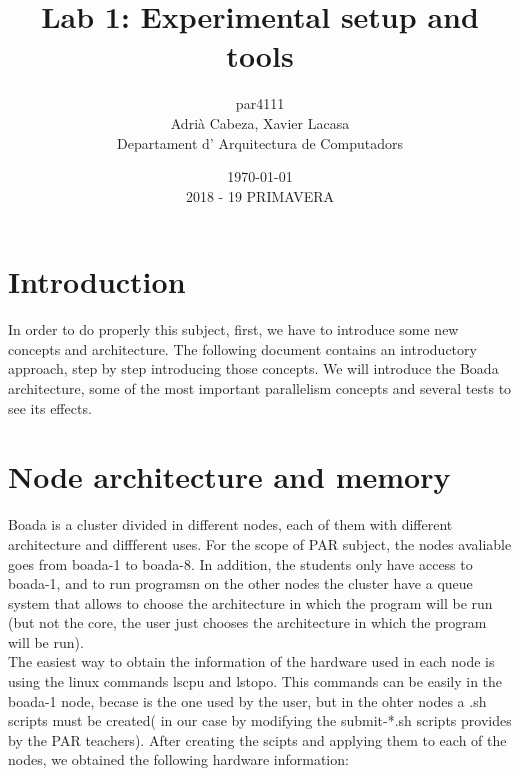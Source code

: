 \documentclass[12]{article}
\author{par4111 \\ Adrià Cabeza, Xavier Lacasa \\ Departament d' Arquitectura de Computadors}
\title{Lab 1: Experimental setup and tools}
\date{\today \\ 2018 - 19 PRIMAVERA}
\begin{document}
\maketitle
\newpage
\tableofcontents
\newpage
\section{Introduction}
In order to do properly this subject, first, we have to introduce some new concepts and architecture.  The following document contains an introductory approach, step by step introducing those concepts. We will introduce the Boada architecture, some of the most important parallelism concepts and several tests to see its effects. 

\section{Node architecture and memory}
Boada is a cluster divided in different nodes, each of them with different architecture and diffferent uses. For the scope of PAR subject, the nodes avaliable goes from boada-1 to boada-8. In addition, the students only have access to boada-1, and to run programsn on the other nodes the cluster have a queue system that allows to choose the architecture in which the program will be run (but not the core, the user just chooses the architecture in which the program will be run).
\\
The easiest way to obtain the information of the hardware used in each node is using the linux commands lscpu and lstopo. This commands can be easily in the boada-1 node, becase is the one used by the user, but in the ohter nodes a .sh scripts must be created( in our case by modifying the submit-*.sh scripts provides by the PAR teachers).
After creating the scipts and applying them to each of the nodes, we obtained the following hardware information: 
\end{document}
